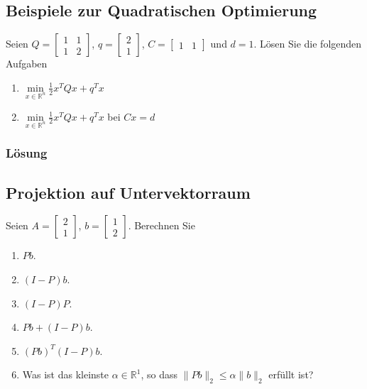 \subsection*{Beispiele zur Quadratischen Optimierung}
\label{sec:uebung_bsp_quad_opt}
Seien $Q=\begin{bmatrix}
1 & 1\\ 1 & 2
\end{bmatrix}$, $q=\begin{bmatrix}
2\\1
\end{bmatrix}$, $C = \begin{bmatrix}
1 & 1
\end{bmatrix}$ und $d = 1$. Lösen Sie die folgenden Aufgaben
\begin{enumerate}[label=\alph*)]
  \item $\min\limits_{x\in\mathbb{R}^n}\frac12 x^TQx + q^T x$
  \item $\min\limits_{x\in\mathbb{R}^n}\frac12 x^TQx +q^T x$ bei $Cx=d$
\end{enumerate}

\subsubsection{Lösung}

\subsection*{Projektion auf Untervektorraum}
\label{sec:uebung_proj_untervekraum} 
Seien $A=\begin{bmatrix}
							2\\1
							\end{bmatrix}$, $b=\begin{bmatrix}
							1\\2
							\end{bmatrix}$. Berechnen Sie 							
\begin{enumerate}[label=\alph*)]
	\item $Pb$. 
	\item $(I-P)b$.
	\item $(I-P)P$.
	\item $Pb+(I-P)b$.
	\item $(Pb)^T(I-P)b$.
	\item Was ist das kleinste $\alpha\in\mathbb{R}^1$, so dass $\|Pb\|_2\le\alpha\|b\|_2$ erfüllt ist? 
\end{enumerate}  

